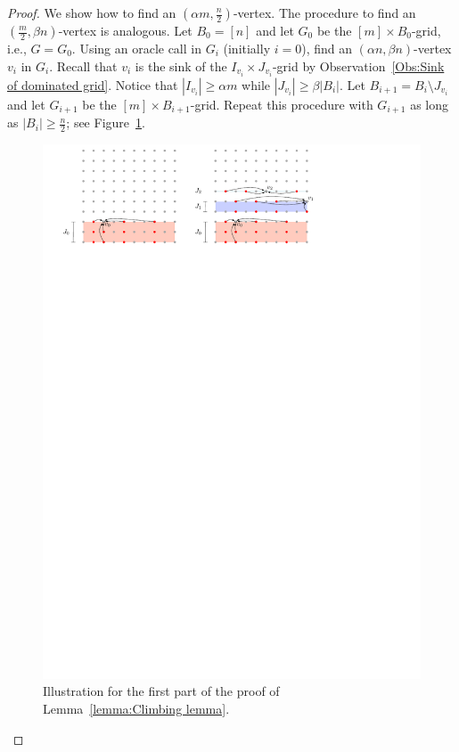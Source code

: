 \documentclass[runningheads,a4paper]{llncs}
\begin{document}
\begin{proof}
We show how to find an $(\alpha m,  \frac{n}{2})$-vertex. The procedure to find an $( \frac{m}{2}, \beta n)$-vertex is analogous.
Let $B_0 = [n]$ and let $G_0$ be the $[m]\times B_0$-grid, i.e., $G = G_0$.
Using an oracle call in $G_i$ (initially $i = 0$), find an $(\alpha n, \beta n)$-vertex $v_i$ in $G_i$. 
Recall that $v_i$ is the sink of the $I_{v_i}\times J_{v_i}$-grid by Observation~\ref{Obs:Sink of dominated grid}.
Notice that $|I_{v_i}| \geq \alpha m$ while $|J_{v_i}| \geq \beta |B_i|$.
Let $B_{i+1} = B_i\setminus J_{v_i}$ and let $G_{i+1}$ be the $[m]\times B_{i+1}$-grid. 
Repeat this procedure with $G_{i+1}$ as long as $|B_i| \geq  \frac{n}{2}$; see Figure~\ref{fig:Climbing Lemma}.

\begin{figure}[h]
\centering
\includegraphics[width=1\textwidth]{ClimbingLemma.pdf}
\caption{\small Illustration for the first part of the proof of Lemma~\ref{lemma:Climbing lemma}.}
\label{fig:Climbing Lemma}
\end{figure}


\end{proof}
\end{document}
